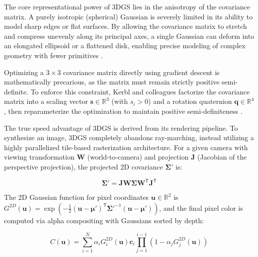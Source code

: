 \documentclass[12pt,a4paper,oneside]{report}
\begin{document}
The core representational power of 3DGS lies in the anisotropy of the covariance matrix. A purely isotropic (spherical) Gaussian is severely limited in its ability to model sharp edges or flat surfaces. By allowing the covariance matrix to stretch and compress unevenly along its principal axes, a single Gaussian can deform into an elongated ellipsoid or a flattened disk, enabling precise modeling of complex geometry with fewer primitives \cite{kerbl20233d}.

Optimizing a $3 \times 3$ covariance matrix directly using gradient descent is mathematically precarious, as the matrix must remain strictly positive semi-definite. To enforce this constraint, Kerbl and colleagues factorize the covariance matrix into a scaling vector $\mathbf{s} \in \mathbb{R}^3$ (with $s_i > 0$) and a rotation quaternion $\mathbf{q} \in \mathbb{R}^4$, then reparameterize the optimization to maintain positive semi-definiteness \cite{kerbl20233d}.

The true speed advantage of 3DGS is derived from its rendering pipeline. To synthesize an image, 3DGS completely abandons ray-marching, instead utilizing a highly parallelized tile-based rasterization architecture. For a given camera with viewing transformation $\mathbf{W}$ (world-to-camera) and projection $\mathbf{J}$ (Jacobian of the perspective projection), the projected 2D covariance $\boldsymbol{\Sigma}'$ is:

\begin{equation}
\boldsymbol{\Sigma}' = \mathbf{J} \mathbf{W} \boldsymbol{\Sigma} \mathbf{W}^\mathsf{T} \mathbf{J}^\mathsf{T}
\end{equation}

The 2D Gaussian function for pixel coordinates $\mathbf{u} \in \mathbb{R}^2$ is $G^{2D}(\mathbf{u}) = \exp\left(-\frac{1}{2} (\mathbf{u} - \boldsymbol{\mu}')^\mathsf{T} \boldsymbol{\Sigma}'^{-1} (\mathbf{u} - \boldsymbol{\mu}')\right)$, and the final pixel color is computed via alpha compositing with Gaussians sorted by depth:

\begin{equation}
C(\mathbf{u}) = \sum_{i=1}^{N} \alpha_i G_i^{2D}(\mathbf{u}) \mathbf{c}_i \prod_{j=1}^{i-1} (1 - \alpha_j G_j^{2D}(\mathbf{u}))
\end{equation}
\end{document}
